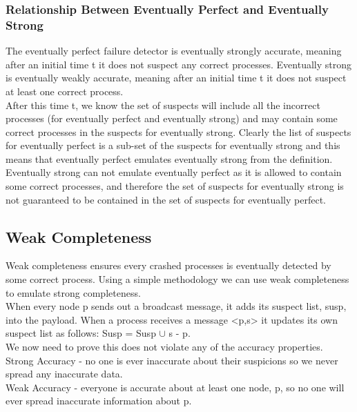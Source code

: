 \documentclass{article}
\begin{document}
\subsubsection{Relationship Between Eventually Perfect and Eventually Strong}

The eventually perfect failure detector is eventually strongly accurate, meaning after an initial time t it does not suspect any correct processes.  Eventually strong is eventually weakly accurate, meaning after an initial time t it does not suspect at least one correct process.  \\

After this time t, we know the set of suspects will include all the incorrect processes (for eventually perfect and eventually strong) and may contain some correct processes in the suspects for eventually strong.  Clearly the list of suspects for eventually perfect is a sub-set of the suspects for eventually strong and this means that eventually perfect emulates eventually strong from the definition.  Eventually strong can not emulate eventually perfect as it is allowed to contain some correct processes, and therefore the set of suspects for eventually strong is not guaranteed to be contained in the set of suspects for eventually perfect.

\subsection{Weak Completeness}

Weak completeness ensures every crashed processes is eventually detected by some correct process.  Using a simple methodology we can use weak completeness to emulate strong completeness. \\

\noindent
When every node p sends out a broadcast message, it adds its suspect list, susp, into the payload.  When a process receives a message <p,s> it updates its own suspect list as follows:  Susp = Susp $\cup$ s - {p}.\\

\noindent
We now need to prove this does not violate any of the accuracy properties.\\

\noindent
Strong Accuracy - no one is ever inaccurate about their suspicions so we never spread any inaccurate data.\\

\noindent
Weak Accuracy - everyone is accurate about at least one node, p, so no one will ever spread inaccurate information about p.\\
\end{document}
